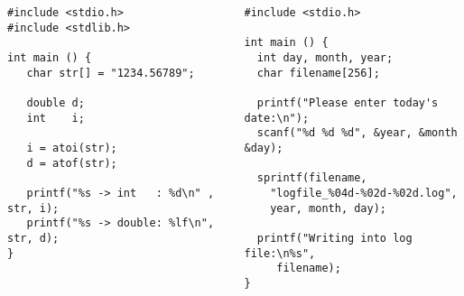 \begin{frame}[fragile]
%
\begin{columns}[T]
\begin{codebox}
\begin{verbatim}
#include <stdio.h>
#include <stdlib.h>

int main () {
   char str[] = "1234.56789";

   double d;
   int    i;

   i = atoi(str);
   d = atof(str);

   printf("%s -> int   : %d\n" , str, i);
   printf("%s -> double: %lf\n", str, d);
}
\end{verbatim}
\end{codebox}
%
\begin{codebox}[sprintf]
\begin{verbatim}
#include <stdio.h>

int main () {
  int day, month, year;
  char filename[256];
	
  printf("Please enter today's date:\n");
  scanf("%d %d %d", &year, &month &day);
	
  sprintf(filename, 
    "logfile_%04d-%02d-%02d.log",
    year, month, day);
    
  printf("Writing into log file:\n%s", 
     filename);
}
\end{verbatim}
\end{codebox}
\end{columns}
%
\end{frame}
